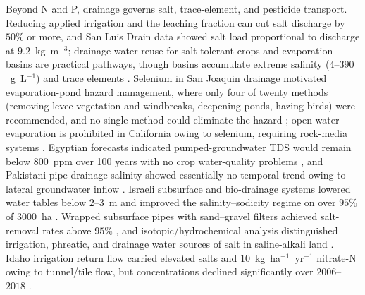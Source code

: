 \documentclass[11pt]{article}
\begin{document}
Beyond N and P, drainage governs salt, trace-element, and pesticide
transport. Reducing applied irrigation and the leaching fraction can cut
salt discharge by $50\%$ or more, and San Luis Drain data showed salt load
proportional to discharge at $9.2$~kg~m$^{-3}$; drainage-water reuse for
salt-tolerant crops and evaporation basins are practical pathways, though
basins accumulate extreme salinity ($4$--$390$~g~L$^{-1}$) and trace
elements \parencite{WESTCOT1988}. Selenium in San Joaquin drainage
motivated evaporation-pond hazard management, where only four of twenty
methods (removing levee vegetation and windbreaks, deepening ponds, hazing
birds) were recommended, and no single method could eliminate the hazard
\parencite{BRADFORD1991}; open-water evaporation is prohibited in
California owing to selenium, requiring rock-media systems
\parencite{Ayars2014}. Egyptian forecasts indicated pumped-groundwater TDS
would remain below $800$~ppm over 100 years with no crop water-quality
problems \parencite{RADSTAKE1988}, and Pakistani pipe-drainage salinity
showed essentially no temporal trend owing to lateral groundwater inflow
\parencite{Kelleners1998}. Israeli subsurface and bio-drainage systems
lowered water tables below $2$--$3$~m and improved the salinity--sodicity
regime on over $95\%$ of $3000$~ha \parencite{Gafni2001}. Wrapped
subsurface pipes with sand--gravel filters achieved salt-removal rates
above $95\%$ \parencite{Wang2024e}, and isotopic/hydrochemical analysis
distinguished irrigation, phreatic, and drainage water sources of salt in
saline-alkali land \parencite{Zhou2023}. Idaho irrigation return flow
carried elevated salts and $10$~kg~ha$^{-1}$~yr$^{-1}$ nitrate-N owing to
tunnel/tile flow, but concentrations declined significantly over
$2006$--$2018$ \parencite{Bjorneberg2020}.
\end{document}
